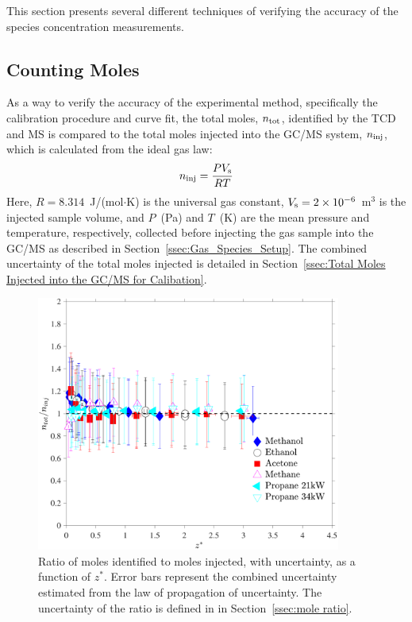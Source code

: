 \documentclass[12pt]{article}
\begin{document}
This section presents several different techniques of verifying the accuracy of the species concentration measurements.


\subsection{Counting Moles}

As a way to verify the accuracy of the experimental method, specifically the calibration procedure and curve fit, the total moles, $n_{\rm tot}$, identified by the TCD and MS is compared to the total moles injected into the GC/MS system, $n_{\rm inj}$, which is calculated from the ideal gas law:
\begin{equation}\label{eq:moles_inj}
n_{\rm inj}=\frac{PV_{\rm s}}{RT}
\end{equation}
Here, $R=8.314$~J/(mol$\cdot$K) is the universal gas constant, $V_{\rm s}=2\times 10^{-6}$~m$^3$ is the injected sample volume, and $P$~(Pa) and $T$~(K) are the mean pressure and temperature, respectively, collected before injecting the gas sample into the GC/MS as described in Section~\ref{ssec:Gas_Species_Setup}. The combined uncertainty of the total moles injected is detailed in Section~\ref{ssec:Total Moles Injected into the GC/MS for Calibation}.

\begin{figure}[h!]
	\centering
\includegraphics[width=10.0cm,keepaspectratio]{mole_ratio_Comparison.pdf}
	\caption[Ratio of moles identified to moles injected]{Ratio of moles identified to moles injected, with uncertainty, as a function of $z^*$. Error bars represent the combined uncertainty estimated from the law of propagation of uncertainty. The uncertainty of the ratio is defined in in Section~\ref{ssec:mole ratio}.}
	\label{fig:Mole_Comp}
\end{figure}
\end{document}
